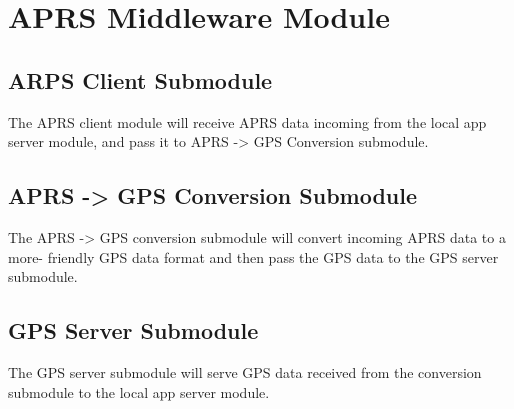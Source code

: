 \section{APRS Middleware Module}

\subsection{ARPS Client Submodule}
The APRS client module will receive APRS data incoming from the local app server module,
and pass it to APRS -> GPS Conversion submodule.

\subsection{APRS -> GPS Conversion Submodule}
The APRS -> GPS conversion submodule will convert incoming APRS data to a more-
friendly GPS data format and then pass the GPS data to the GPS server submodule.

\subsection{GPS Server Submodule}
The GPS server submodule will serve GPS data received from the conversion submodule
to the local app server module.